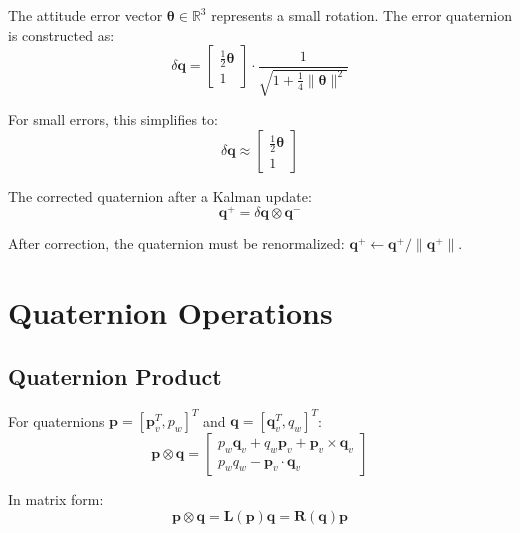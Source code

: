 \documentclass[11pt,a4paper]{article}
\newcommand{\mat}[1]{\mathbf{#1}}
\newcommand{\vect}[1]{\boldsymbol{#1}}
\newcommand{\quat}[1]{\mathbf{#1}}
\newcommand{\Rn}{\mathbb{R}}
\begin{document}
The attitude error vector $\vect{\theta} \in \Rn^3$ represents a small rotation. The error quaternion is constructed as:
\begin{equation}
    \delta\quat{q} = \begin{bmatrix} \frac{1}{2}\vect{\theta} \\ 1 \end{bmatrix} \cdot \frac{1}{\sqrt{1 + \frac{1}{4}\|\vect{\theta}\|^2}}
    \label{eq:error_quat}
\end{equation}

For small errors, this simplifies to:
\begin{equation}
    \delta\quat{q} \approx \begin{bmatrix} \frac{1}{2}\vect{\theta} \\ 1 \end{bmatrix}
\end{equation}

The corrected quaternion after a Kalman update:
\begin{equation}
    \quat{q}^+ = \delta\quat{q} \otimes \quat{q}^-
    \label{eq:quat_correction}
\end{equation}

After correction, the quaternion must be renormalized: $\quat{q}^+ \leftarrow \quat{q}^+ / \|\quat{q}^+\|$.

\section{Quaternion Operations}

\subsection{Quaternion Product}

For quaternions $\quat{p} = [\vect{p}_v^T, p_w]^T$ and $\quat{q} = [\vect{q}_v^T, q_w]^T$:
\begin{equation}
    \quat{p} \otimes \quat{q} = \begin{bmatrix}
        p_w \vect{q}_v + q_w \vect{p}_v + \vect{p}_v \times \vect{q}_v \\
        p_w q_w - \vect{p}_v \cdot \vect{q}_v
    \end{bmatrix}
\end{equation}

In matrix form:
\begin{equation}
    \quat{p} \otimes \quat{q} = \mat{L}(\quat{p}) \quat{q} = \mat{R}(\quat{q}) \quat{p}
\end{equation}
\end{document}
